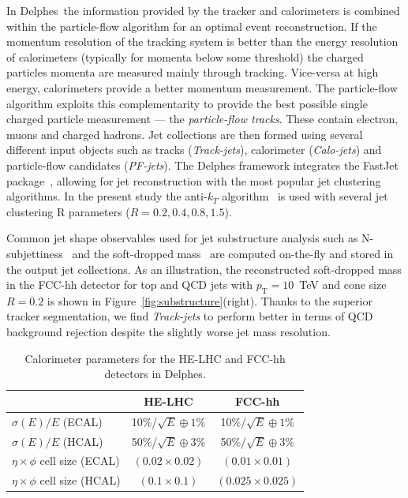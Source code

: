 \documentclass[a4paper,11pt]{article}
\newcommand{\pt}{\ensuremath{p_{\text{T}}}}
\newcommand{\delphes}{{\sc Delphes}}
\begin{document}
In \delphes{}~the information provided by the tracker and calorimeters is combined within the particle-flow algorithm for an optimal event reconstruction. If the momentum resolution of the tracking system is better than the energy resolution of calorimeters (typically for momenta below some threshold) the charged particles momenta are measured mainly through tracking. Vice-versa at high energy, calorimeters provide a better momentum measurement. The particle-flow algorithm exploits this complementarity to provide the best possible single charged particle measurement --- the \emph{particle-flow tracks}. These contain electron, muons and charged hadrons. Jet collections are then formed using several different input objects such as tracks (\emph{Track-jets}), calorimeter (\emph{Calo-jets}) and particle-flow candidates (\emph{PF-jets}). The Delphes framework integrates the FastJet package~\cite{Cacciari:2011ma}, allowing for jet reconstruction with the most popular jet clustering algorithms. In the present study the anti-$k_T$ algorithm~\cite{Cacciari:2008gp} is used with several jet clustering R parameters ($R=0.2, 0.4, 0.8, 1.5$).

Common jet shape observables used for jet substructure analysis such as N-subjettiness~\cite{Thaler:2010tr} and the soft-dropped mass~\cite{Larkoski:2014wba} are computed on-the-fly and stored in the output jet collections. As an illustration, the reconstructed soft-dropped mass in the FCC-hh detector for top and QCD jets with $\pt=10$~TeV and cone size $R=0.2$ is shown in Figure~\ref{fig:substructure}(right). Thanks to the superior tracker segmentation, we find \emph{Track-jets} to perform better in terms of QCD background rejection despite the slightly worse jet mass resolution.

\begin {table}[htb!]
\begin{center}
\begin{tabular}{l||c|c}
& HE-LHC & FCC-hh \\
  \hline
  \hline
$\sigma(E)/E $ (ECAL)& 10\%/$\sqrt{E} \oplus 1\%$ &  10\%/$\sqrt{E} \oplus 1\%$\\
   \hline
$\sigma(E)/E $ (HCAL)& 50\%/$\sqrt{E} \oplus 3\%$  &  50\%/$\sqrt{E} \oplus 3\%$\\
  \hline
  \hline
$\eta \times \phi$ cell size (ECAL)& $(0.02\times0.02)$ &  $(0.01\times0.01)$\\
  \hline
 $\eta \times \phi$ cell size  (HCAL)& $(0.1\times0.1)$ & $(0.025\times0.025)$
\end{tabular}
\caption{Calorimeter parameters for the HE-LHC and FCC-hh detectors in Delphes.}
\label{tab:cal_param}
\end{center}
\end{table}
\end{document}
